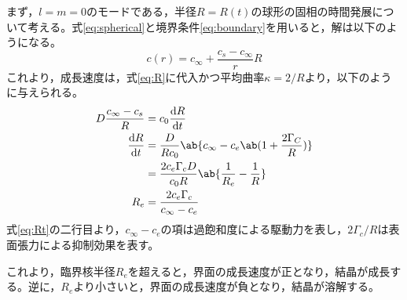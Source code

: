 \documentclass[autodetect-engine,dvi=dvipdfmx,a4paper,ja=standard,oneside,openany,11pt,draft]{bxjsbook}
\begin{document}
まず，$l=m=0$のモードである，半径$R=R(t)$の球形の固相の時間発展について考える。式\eqref{eq:spherical}と境界条件\eqref{eq:boundary}を用いると，解は以下のようになる。
\begin{equation}
  c(r) = c_{\infty} + \frac{c_s-c_{\infty}}{r}R
  \label{eq:sphere}
\end{equation}
これより，成長速度は，式\eqref{eq:R}に代入かつ平均曲率$\kappa=2/R$より，以下のように与えられる。
\begin{equation}
  \begin{split}
    D\frac{c_\infty-c_s}{R} & =c_0\odv{R}{t}                                                 \\
    \odv{R}{t}              & = \frac{D}{Rc_0}\ab\{c_\infty-c_e\ab(1+\frac{2\Gamma_C}{R})\}  \\
                            & = \frac{2c_e\Gamma_c D}{c_0 R}\ab\{\frac{1}{R_e}-\frac{1}{R}\} \\
    R_e                     & =\frac{2c_e \Gamma_c }{c_\infty-c_e}
  \end{split}
  \label{eq:Rt}
\end{equation}
式\eqref{eq:Rt}の二行目より，$c_\infty-c_e$の項は過飽和度による駆動力を表し，$2\Gamma_c/R$は表面張力による抑制効果を表す。

これより，臨界核半径$R_e$を超えると，界面の成長速度が正となり，結晶が成長する。逆に，$R_e$より小さいと，界面の成長速度が負となり，結晶が溶解する。
\end{document}
